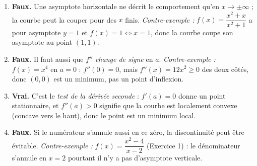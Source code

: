 \documentclass[11pt]{article}
\begin{document}
\begin{corrige}
\begin{enumerate}
    \item \textbf{Faux.} Une asymptote horizontale ne décrit le comportement qu'en $x \to \pm\infty$ ; la courbe peut la couper pour des $x$ finis. \emph{Contre-exemple :} $f(x) = \dfrac{x^2+x}{x^2+1}$ a pour asymptote $y = 1$ et $f(x)=1 \iff x=1$, donc la courbe coupe son asymptote au point $(1,1)$.
    \item \textbf{Faux.} Il faut aussi que $f''$ \emph{change de signe} en $a$. \emph{Contre-exemple :} $f(x) = x^4$ en $a = 0$ : $f''(0) = 0$, mais $f''(x) = 12x^2 \ge 0$ des deux côtés, donc $(0,0)$ est un minimum, pas un point d'inflexion.
    \item \textbf{Vrai.} C'est le \emph{test de la dérivée seconde} : $f'(a) = 0$ donne un point stationnaire, et $f''(a) > 0$ signifie que la courbe est localement convexe (concave vers le haut), donc le point est un minimum local.
    \item \textbf{Faux.} Si le numérateur s'annule aussi en ce zéro, la discontinuité peut être évitable. \emph{Contre-exemple :} $f(x) = \dfrac{x^2-4}{x-2}$ (Exercice 1) : le dénominateur s'annule en $x = 2$ pourtant il n'y a pas d'asymptote verticale.
\end{enumerate}
\end{corrige}
\end{document}

